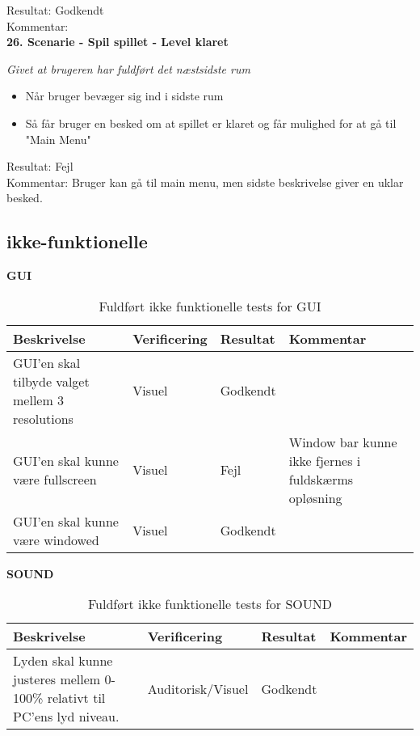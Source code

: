 Resultat: Godkendt\\
Kommentar:\\

\textbf{26. Scenarie - Spil spillet - Level klaret}

\textit{Givet at brugeren har fuldført det næstsidste rum}

\begin{itemize}
  \item Når bruger bevæger sig ind i sidste rum
  \item Så får bruger en besked om at spillet er klaret og får mulighed for at gå til "Main Menu"
\end{itemize}

Resultat: Fejl\\
Kommentar: Bruger kan gå til main menu, men sidste beskrivelse giver en uklar besked.\\

\subsection{ikke-funktionelle}
\textbf{GUI}
\begin{table}[H]
\caption{ Fuldført ikke funktionelle tests for GUI}
\label{tab:}
\begin{tabular}{|p{3cm}|p{3cm}|p{3cm}|p{3cm}|}
\hline
Beskrivelse & Verificering & Resultat & Kommentar \\
\hline
GUI'en skal tilbyde valget mellem 3 resolutions & Visuel & Godkendt & \\
\hline
GUI'en skal kunne være fullscreen & Visuel & Fejl & Window bar kunne ikke fjernes i fuldskærms opløsning\\
\hline
GUI'en skal kunne være windowed & Visuel & Godkendt & \\
\hline
\end{tabular}
\end{table}

\textbf{SOUND}
\begin{table}[H]
\caption{ Fuldført ikke funktionelle tests for SOUND}
\label{tab:}
\begin{tabular}{|p{3cm}|p{3cm}|p{3cm}|p{3cm}|}
\hline
Beskrivelse & Verificering & Resultat & Kommentar \\
\hline
Lyden skal kunne justeres mellem 0-100\% relativt til PC'ens lyd niveau. & Auditorisk/Visuel & Godkendt & \\
\hline
\end{tabular}
\end{table}

